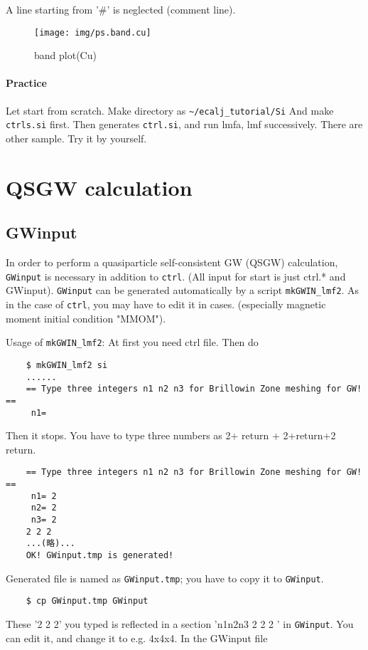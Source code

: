 \documentclass[a4paper,10pt,epsf,fleqn]{article}
\begin{document}
A line starting from '\#' is neglected (comment line).

\begin{figure}[h]
 \begin{center}
  \texttt{[image: img/ps.band.cu]}
  \caption{band plot(Cu)}
 \end{center}
\end{figure}

\paragraph{Practice}
Let start from scratch. 
Make directory as \verb+~/ecalj_tutorial/Si+ 
And make \verb+ctrls.si+ first.
Then generates \verb+ctrl.si+, and run lmfa, lmf successively. 
There are other sample. Try it by yourself.

\newpage
\section{QSGW calculation}
\subsection{GWinput}
\label{GWinput}
In order to perform a quasiparticle self-consistent GW (QSGW) calculation, 
\verb+GWinput+ is necessary in addition to \verb+ctrl+.
(All input for start is just ctrl.* and GWinput).
\verb+GWinput+ can be generated automatically by a script
\verb+mkGWIN_lmf2+. 
As in the case of \verb+ctrl+, you may have to edit it in cases.
(especially magnetic moment initial condition "MMOM").

Usage of \verb+mkGWIN_lmf2+: At first you need ctrl file. Then do
\begin{verbatim}
    $ mkGWIN_lmf2 si
    ......
    == Type three integers n1 n2 n3 for Brillowin Zone meshing for GW! ==
     n1=
\end{verbatim}
Then it stops. You have to type three numbers as
2+ return + 2+return+2 return.
\begin{verbatim}
    == Type three integers n1 n2 n3 for Brillowin Zone meshing for GW! ==
     n1= 2
     n2= 2
     n3= 2
    2 2 2
    ...(略)...
    OK! GWinput.tmp is generated!
\end{verbatim}
Generated file is named as \verb+GWinput.tmp+; you have to copy it to \verb+GWinput+.
\begin{verbatim}
    $ cp GWinput.tmp GWinput
\end{verbatim}
These '2 2 2' you typed is reflected in a section 'n1n2n3 2 2 2 ' in \verb+GWinput+.
You can edit it, and change it to e.g. 4x4x4.
In the GWinput file
\end{document}
